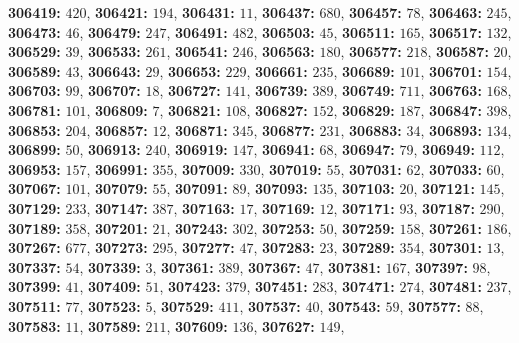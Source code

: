 \textsf{\bfseries 306419:} $420$, \textsf{\bfseries 306421:} $194$, \textsf{\bfseries 306431:} $11$, \textsf{\bfseries 306437:} $680$, \textsf{\bfseries 306457:} $78$, \textsf{\bfseries 306463:} $245$, \textsf{\bfseries 306473:} $46$, \textsf{\bfseries 306479:} $247$, \textsf{\bfseries 306491:} $482$, \textsf{\bfseries 306503:} $45$, \textsf{\bfseries 306511:} $165$, \textsf{\bfseries 306517:} $132$, \textsf{\bfseries 306529:} $39$, \textsf{\bfseries 306533:} $261$, \textsf{\bfseries 306541:} $246$, \textsf{\bfseries 306563:} $180$, \textsf{\bfseries 306577:} $218$, \textsf{\bfseries 306587:} $20$, \textsf{\bfseries 306589:} $43$, \textsf{\bfseries 306643:} $29$, \textsf{\bfseries 306653:} $229$, \textsf{\bfseries 306661:} $235$, \textsf{\bfseries 306689:} $101$, \textsf{\bfseries 306701:} $154$, \textsf{\bfseries 306703:} $99$, \textsf{\bfseries 306707:} $18$, \textsf{\bfseries 306727:} $141$, \textsf{\bfseries 306739:} $389$, \textsf{\bfseries 306749:} $711$, \textsf{\bfseries 306763:} $168$, \textsf{\bfseries 306781:} $101$, \textsf{\bfseries 306809:} $7$, \textsf{\bfseries 306821:} $108$, \textsf{\bfseries 306827:} $152$, \textsf{\bfseries 306829:} $187$, \textsf{\bfseries 306847:} $398$, \textsf{\bfseries 306853:} $204$, \textsf{\bfseries 306857:} $12$, \textsf{\bfseries 306871:} $345$, \textsf{\bfseries 306877:} $231$, \textsf{\bfseries 306883:} $34$, \textsf{\bfseries 306893:} $134$, \textsf{\bfseries 306899:} $50$, \textsf{\bfseries 306913:} $240$, \textsf{\bfseries 306919:} $147$, \textsf{\bfseries 306941:} $68$, \textsf{\bfseries 306947:} $79$, \textsf{\bfseries 306949:} $112$, \textsf{\bfseries 306953:} $157$, \textsf{\bfseries 306991:} $355$, \textsf{\bfseries 307009:} $330$, \textsf{\bfseries 307019:} $55$, \textsf{\bfseries 307031:} $62$, \textsf{\bfseries 307033:} $60$, \textsf{\bfseries 307067:} $101$, \textsf{\bfseries 307079:} $55$, \textsf{\bfseries 307091:} $89$, \textsf{\bfseries 307093:} $135$, \textsf{\bfseries 307103:} $20$, \textsf{\bfseries 307121:} $145$, \textsf{\bfseries 307129:} $233$, \textsf{\bfseries 307147:} $387$, \textsf{\bfseries 307163:} $17$, \textsf{\bfseries 307169:} $12$, \textsf{\bfseries 307171:} $93$, \textsf{\bfseries 307187:} $290$, \textsf{\bfseries 307189:} $358$, \textsf{\bfseries 307201:} $21$, \textsf{\bfseries 307243:} $302$, \textsf{\bfseries 307253:} $50$, \textsf{\bfseries 307259:} $158$, \textsf{\bfseries 307261:} $186$, \textsf{\bfseries 307267:} $677$, \textsf{\bfseries 307273:} $295$, \textsf{\bfseries 307277:} $47$, \textsf{\bfseries 307283:} $23$, \textsf{\bfseries 307289:} $354$, \textsf{\bfseries 307301:} $13$, \textsf{\bfseries 307337:} $54$, \textsf{\bfseries 307339:} $3$, \textsf{\bfseries 307361:} $389$, \textsf{\bfseries 307367:} $47$, \textsf{\bfseries 307381:} $167$, \textsf{\bfseries 307397:} $98$, \textsf{\bfseries 307399:} $41$, \textsf{\bfseries 307409:} $51$, \textsf{\bfseries 307423:} $379$, \textsf{\bfseries 307451:} $283$, \textsf{\bfseries 307471:} $274$, \textsf{\bfseries 307481:} $237$, \textsf{\bfseries 307511:} $77$, \textsf{\bfseries 307523:} $5$, \textsf{\bfseries 307529:} $411$, \textsf{\bfseries 307537:} $40$, \textsf{\bfseries 307543:} $59$, \textsf{\bfseries 307577:} $88$, \textsf{\bfseries 307583:} $11$, \textsf{\bfseries 307589:} $211$, \textsf{\bfseries 307609:} $136$, \textsf{\bfseries 307627:} $149$, 
